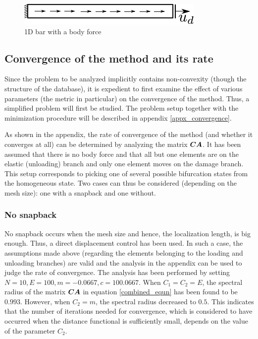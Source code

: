 \documentclass[11pt]{elsarticle}
\begin{document}
\begin{figure}
	\centering
	\includegraphics[width=0.5\linewidth]{Images/1D_bar_bf.pdf}
	\caption{1D bar with a body force \label{1D_bar_bf}}
\end{figure}


\subsection{Convergence of the method and its rate}

Since the problem to be analyzed implicitly contains non-convexity (though the structure of the database), it is expedient to first examine the effect of various parameters (the metric in particular) on the convergence of the method. Thus, a simplified problem will first be studied. The problem setup together with the minimization procedure will be described in appendix \ref{appx_convergence}. 

As shown in the appendix, the rate of convergence of the method (and whether it converges at all) can be determined by analyzing the matrix $\mbox{\boldmath $C$} \mbox{\boldmath $A$} $. It has been assumed that there is no body force and that all but one elements are on the elastic (unloading) branch and only one element moves on the damage branch. This setup corresponds to picking one of several possible bifurcation states from the homogeneous state. Two cases can thus be considered (depending on the mesh size): one with a snapback and one without. 

\subsubsection*{No snapback}
No snapback occurs when the mesh size and hence, the localization length, is big enough. Thus, a direct displacement control has been used. In such a case, the assumptions made above (regarding the elements belonging to the loading and unloading branches) are valid and the analysis in the appendix can be used to judge the rate of convergence. The analysis has been performed by setting $N=10, E=100, m=-0.0667, c=100.0667$. When $C_1=C_2=E$, the spectral radius of the matrix $\mbox{\boldmath $C$} \mbox{\boldmath $A$} $ in equation \ref{combined_equn} has been found to be $0.993$. However, when $C_2=m$, the spectral radius decreased to $0.5$. This indicates that the number of iterations needed for convergence, which is considered to have occurred when the distance functional is sufficiently small, depends on the value of the parameter $C_2$.
\end{document}
